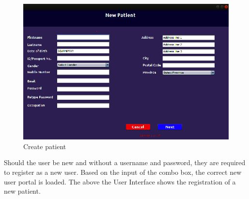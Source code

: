 \documentclass[11 pt]{article}
\begin{document}
    \begin{figure}[h]
    \centering 
    \includegraphics[width=\linewidth]{UI_create_ patient.png}
    \caption{Create patient}
    \label{fig:create_patient}
    \end{figure}
 Should the user be new and without a username and password, they are required to register as a new user. Based on the input of the combo box, the correct new user portal is loaded. The above the User Interface shows the registration of a new patient. 
 
\end{document}
